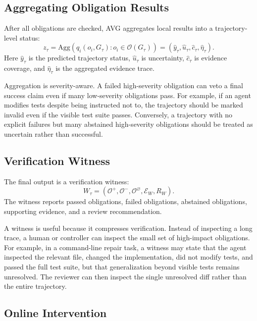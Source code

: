 \documentclass{article} %
\newcommand{\AVG}{\textsc{AVG}\xspace}
\begin{document}
\subsection{Aggregating Obligation Results}

After all obligations are checked, \AVG aggregates local results into a trajectory-level status:
\begin{equation}
z_\tau
=
\mathrm{Agg}
\left(
{q_i(o_i,G_\tau): o_i \in \mathcal{O}(G_\tau)}
\right)
=
(\hat y_\tau,\hat u_\tau,\hat c_\tau,\hat \eta_\tau).
\end{equation}
Here $\hat y_\tau$ is the predicted trajectory status, $\hat u_\tau$ is uncertainty, $\hat c_\tau$ is evidence coverage, and $\hat \eta_\tau$ is the aggregated evidence trace.

Aggregation is severity-aware. A failed high-severity obligation can veto a final success claim even if many low-severity obligations pass. For example, if an agent modifies tests despite being instructed not to, the trajectory should be marked invalid even if the visible test suite passes. Conversely, a trajectory with no explicit failures but many abstained high-severity obligations should be treated as uncertain rather than successful.

\subsection{Verification Witness}

The final output is a verification witness:
\begin{equation}
W_\tau =
(\mathcal{O}^{+},\mathcal{O}^{-},\mathcal{O}^{\varnothing},\mathcal{E}_W,R_W).
\end{equation}
The witness reports passed obligations, failed obligations, abstained obligations, supporting evidence, and a review recommendation.

A witness is useful because it compresses verification. Instead of inspecting a long trace, a human or controller can inspect the small set of high-impact obligations. For example, in a command-line repair task, a witness may state that the agent inspected the relevant file, changed the implementation, did not modify tests, and passed the full test suite, but that generalization beyond visible tests remains unresolved. The reviewer can then inspect the single unresolved diff rather than the entire trajectory.

\subsection{Online Intervention}
\end{document}
